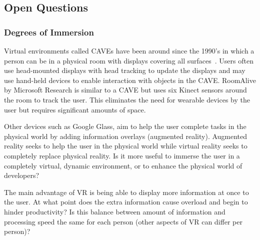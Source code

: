\documentclass[conference]{IEEEtran}
\begin{document}
\subsection{Open Questions}


\subsubsection{Degrees of Immersion}

Virtual environments called CAVEs have been around since the 1990's in which a person can be in a physical room with displays covering all surfaces~\cite{Cruz-Neira:CAVE}.  
Users often use head-mounted displays with head tracking to update the displays and may use hand-held devices to enable interaction with objects in the CAVE.
RoomAlive by Microsoft Research is similar to a CAVE but uses six Kinect sensors around the room to track the user.  This eliminates the need for wearable devices by the user but requires significant amounts of space.~\cite{Jones:RoomAlive}

Other devices such as Google Glass, aim to help the user complete tasks in the physical world by adding information overlays (augmented reality). 
Augmented reality seeks to help the user in the physical world while virtual reality seeks to completely replace physical reality. 
Is it more useful to immerse the user in a completely virtual, dynamic environment, or to enhance the physical world of developers?
  

The main advantage of VR is being able to display more information at once to the user.  
At what point does the extra information cause overload and begin to hinder productivity?  
Is this balance between amount of information and processing speed the same for each person (other aspects of VR can differ per person)?
\end{document}
